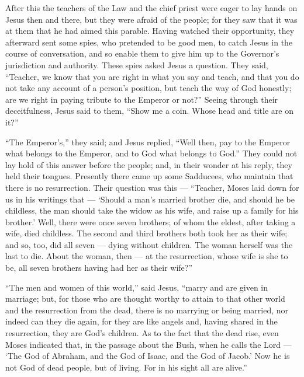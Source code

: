  After this the teachers of the Law and the chief priest
were eager to lay hands on Jesus then and there, but they were afraid of
the people; for they saw that it was at them that he had aimed this
parable.  Having watched their opportunity, they afterward
sent some spies, who pretended to be good men, to catch Jesus in the
course of conversation, and so enable them to give him up to the
Governor's jurisdiction and authority.  These spies asked
Jesus a question. They said, ``Teacher, we know that you are right in
what you say and teach, and that you do not take any account of a
person's position, but teach the way of God honestly;  are
we right in paying tribute to the Emperor or not?''  Seeing
through their deceitfulness, Jesus said to them,  ``Show me
a coin. Whose head and title are on it?''

 ``The Emperor's,'' they said; and Jesus replied, ``Well
then, pay to the Emperor what belongs to the Emperor, and to God what
belongs to God.''  They could not lay hold of this answer
before the people; and, in their wonder at his reply, they held their
tongues.  Presently there came up some Sadducees, who
maintain that there is no resurrection. Their question was this ---
 ``Teacher, Moses laid down for us in his writings that ---
`Should a man's married brother die, and should he be childless, the man
should take the widow as his wife, and raise up a family for his
brother.'  Well, there were once seven brothers; of whom
the eldest, after taking a wife, died childless.  The
second and third brothers both took her as their wife;  and
so, too, did all seven --- dying without children.  The
woman herself was the last to die.  About the woman, then
--- at the resurrection, whose wife is she to be, all seven brothers
having had her as their wife?''

 ``The men and women of this world,'' said Jesus, ``marry
and are given in marriage;  but, for those who are thought
worthy to attain to that other world and the resurrection from the dead,
there is no marrying or being married,  nor indeed can they
die again, for they are like angels and, having shared in the
resurrection, they are God's children.  As to the fact that
the dead rise, even Moses indicated that, in the passage about the Bush,
when he calls the Lord --- `The God of Abraham, and the God of Isaac,
and the God of Jacob.'  Now he is not God of dead people,
but of living. For in his sight all are alive.''

